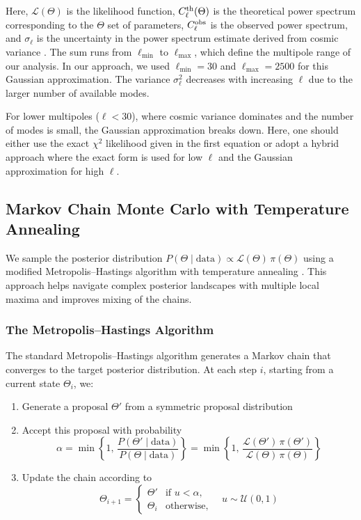 \documentclass[11pt]{article}
\theoremstyle{definition}
\begin{document}
Here, $\mathcal{L}(\Theta)$ is the likelihood function, $C_\ell^{\rm th}(\Theta)$ is the theoretical power spectrum corresponding to the $\Theta$ set of parameters, $C_\ell^{\rm obs}$ is the observed power spectrum, and $\sigma_\ell$ is the uncertainty in the power spectrum estimate derived from cosmic variance \cite{knox1995}. The sum runs from $\ell_{\min}$ to $\ell_{\max}$, which define the multipole range of our analysis. In our approach, we used $\ell_{\min}=30$ and $\ell_{\max}=2500$ for this Gaussian approximation. The variance $\sigma_\ell^2$ decreases with increasing $\ell$ due to the larger number of available modes.

For lower multipoles ($\ell<30$), where cosmic variance dominates and the number of modes is small, the Gaussian approximation breaks down. Here, one should either use the exact $\chi^2$ likelihood given in the first equation or adopt a hybrid approach where the exact form is used for low $\ell$ and the Gaussian approximation for high $\ell$.

\subsection{Markov Chain Monte Carlo with Temperature Annealing}

We sample the posterior distribution $P(\Theta\mid\mathrm{data})\propto \mathcal{L}(\Theta)\,\pi(\Theta)$ using a modified Metropolis--Hastings algorithm with temperature annealing \cite{lewis2002}. This approach helps navigate complex posterior landscapes with multiple local maxima and improves mixing of the chains.

\subsubsection{The Metropolis--Hastings Algorithm}

The standard Metropolis--Hastings algorithm generates a Markov chain that converges to the target posterior distribution. At each step $i$, starting from a current state $\Theta_i$, we:

\begin{enumerate}
\item Generate a proposal $\Theta'$ from a symmetric proposal distribution
\item Accept this proposal with probability
\begin{equation}
  \alpha = \min \left\{1,\,
    \frac{P(\Theta'\mid\mathrm{data})}{P(\Theta\mid\mathrm{data})}
  \right\} = \min \left\{1,\,
    \frac{\mathcal{L}(\Theta')\,\pi(\Theta')}
         {\mathcal{L}(\Theta)\,\pi(\Theta)}
  \right\}
\end{equation}
\item Update the chain according to
\begin{equation}
  \Theta_{i+1} =
  \begin{cases}
    \Theta' & \text{if }u<\alpha,\\
    \Theta_i & \text{otherwise},
  \end{cases}
  \quad u\sim\mathcal{U}(0,1)
\end{equation}
\end{enumerate}
\end{document}
